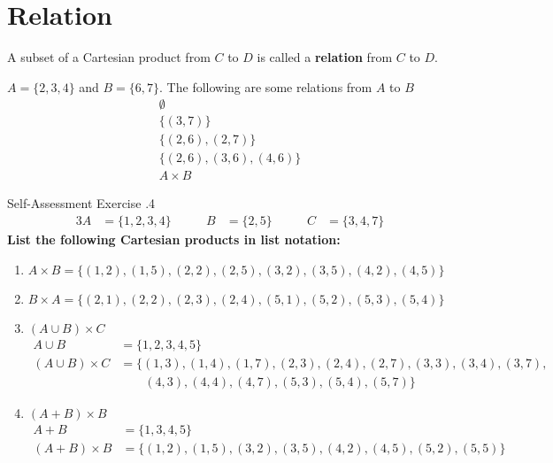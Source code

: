 \documentclass[../notes.tex]{subfiles}
\begin{document}
		\section{Relation}
			A subset of a Cartesian product from $C$ to $D$ is called a \textbf{relation} from $C$ to $D$.
			\begin{example}
				$A = \{2, 3, 4\}$ and  $B = \{6, 7\}$. The following are some relations from $A$ to $B$
				\begin{align*}
					\emptyset \tag*{(This is a subset, even though it has no elements)}\\
					\bigl\{(3, 7)\bigr\}\\
					\bigl\{(2, 6), (2, 7)\bigr\}\\
					\bigl\{(2, 6), (3, 6), (4, 6)\bigr\}\\
					A \times B
				\end{align*}
				\pagebreak
			\end{example}
				\begin{exercise}{Self-Assessment Exercise \thechapter.4}
					\begin{alignat*}{3}
						A &= \{1, 2, 3, 4\} \qquad & B &= \{2, 5\} \qquad & C &= \{3, 4, 7\}
					\end{alignat*}
					\textbf{List the following Cartesian products in list notation:}
					\begin{enumerate}[label=(\alph*)]
						\item $A \times B = \bigl\{(1, 2), (1, 5), (2, 2), (2, 5), (3, 2), (3, 5), (4, 2), (4, 5)\bigr\}$
						\item $B \times A = \bigl\{(2, 1), (2, 2), (2, 3), (2, 4), (5, 1), (5, 2), (5, 3), (5, 4)\bigr\}$
						\item $(A \cup B) \times C$
							\begin{align*}
								A \cup B &= \{1, 2, 3, 4, 5\}\\
								(A \cup B) \times C &= \bigl\{(1, 3), (1, 4), (1, 7), (2, 3), (2, 4), (2, 7), (3, 3), (3, 4), (3, 7),\\
								& \qquad (4, 3), (4, 4), (4, 7), (5, 3), (5, 4), (5, 7)\bigr\}
							\end{align*}
						\item $(A + B) \times B$
							\begin{align*}
								A + B &= \{1, 3, 4, 5\}\\
								(A + B) \times B &= \bigl\{(1, 2), (1, 5), (3, 2), (3, 5), (4, 2), (4, 5), (5, 2), (5, 5)\bigr\}
							\end{align*}
					\end{enumerate}
				\end{exercise}
				\pagebreak
\end{document}

